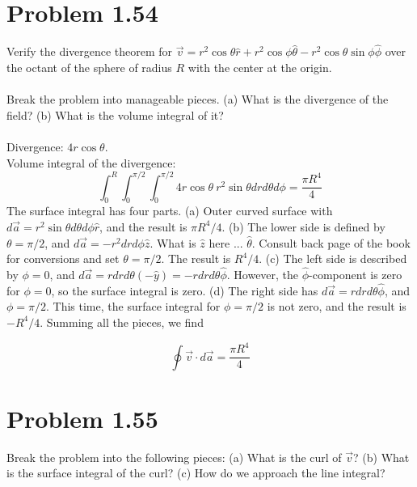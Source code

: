 \documentclass[10pt]{article}
\begin{document}
\maketitle

\section{Problem 1.54}

Verify the divergence theorem for $\vec{v} = r^2 \cos\theta \hat{r} + r^2 \cos\phi \hat{\theta} - r^2 \cos\theta \sin\phi \hat{\phi}$ over the octant of the sphere of radius $R$ with the center at the origin. \\ \\
Break the problem into manageable pieces. (a) What is the divergence of the field? (b) What is the volume integral of it? \\ \\
Divergence: $4r\cos\theta$. \\
Volume integral of the divergence:
\begin{equation}
\int_0^R \int_0^{\pi/2} \int_0^{\pi/2} 4 r \cos\theta ~ r^2 \sin\theta dr d\theta d\phi = \frac{\pi R^4}{4}
\end{equation}
The surface integral has four parts. (a) Outer curved surface with $d\vec{a} = r^2 \sin\theta d\theta d\phi \hat{r}$, and the result is $\pi R^4/4$.  (b) The lower side is defined by $\theta = \pi/2$, and $d\vec{a} = -r^2 dr d\phi \hat{z}$.  What is $\hat{z}$ here ... $\hat{\theta}$. Consult back page of the book for conversions and set $\theta = \pi/2$.  The result is $R^4/4$. (c)  The left side is described by $\phi = 0$, and $d\vec{a} = r dr d\theta (-\hat{y}) = -r dr d\theta \hat{\phi}$.  However, the $\hat{\phi}$-component is zero for $\phi = 0$, so the surface integral is zero.  (d) The right side has $d\vec{a} = r dr d\theta \hat{\phi}$, and $\phi = \pi/2$.  This time, the surface integral for $\phi = \pi/2$ is not zero, and the result is $-R^4/4$.  Summing all the pieces, we find

\begin{equation}
\oint \vec{v} \cdot d\vec{a} = \frac{\pi R^4}{4}
\end{equation}

\section{Problem 1.55}

Break the problem into the following pieces: (a) What is the curl of $\vec{v}$?  (b) What is the surface integral of the curl?  (c) How do we approach the line integral? \\ \\
\end{document}
